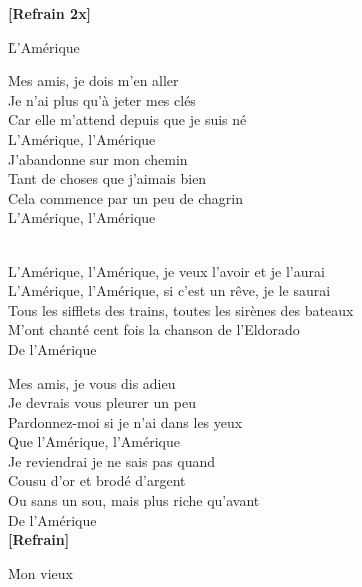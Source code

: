 \documentclass{novel}
\begin{document}
\textbf{[Refrain 2x]}

\newpage
\large

\h*{L’Amérique}

Mes amis, je dois m'en aller \\
Je n'ai plus qu'à jeter mes clés \\
Car elle m'attend depuis que je suis né \\
L'Amérique, l’Amérique \\

J'abandonne sur mon chemin \\
Tant de choses que j'aimais bien \\
Cela commence par un peu de chagrin \\
L'Amérique, l’Amérique \\

\begin{bfseries}
[Refrain:]\\
L'Amérique, l'Amérique, je veux l'avoir et je l'aurai \\
L'Amérique, l'Amérique, si c'est un rêve, je le saurai \\
Tous les sifflets des trains, toutes les sirènes des bateaux \\
M'ont chanté cent fois la chanson de l'Eldorado \\
De l'Amérique \\
\end{bfseries}

Mes amis, je vous dis adieu \\
Je devrais vous pleurer un peu \\
Pardonnez-moi si je n'ai dans les yeux \\
Que l'Amérique, l’Amérique \\

Je reviendrai je ne sais pas quand \\
Cousu d'or et brodé d'argent \\
Ou sans un sou, mais plus riche qu'avant \\
De l'Amérique \\

\textbf{[Refrain]}


\newpage
\normalsize

\h*{Mon vieux}
\end{document}
